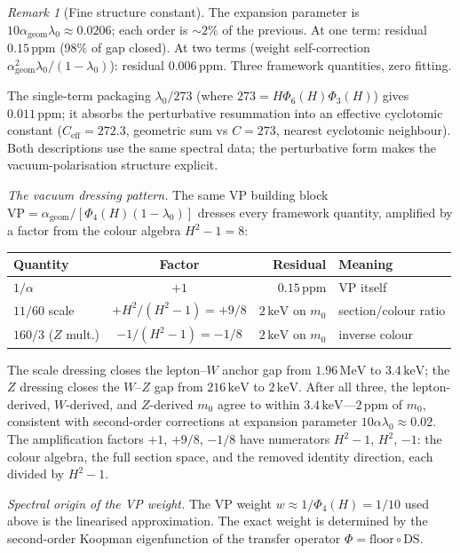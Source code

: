 \documentclass[11pt,a4paper]{article}
\theoremstyle{definition}
\theoremstyle{remark}
\newtheorem{remark}[theorem]{Remark}
\begin{document}
\begin{remark}[Fine structure constant]
The expansion parameter is $10\alpha_{\mathrm{geom}}\lambda_0\approx 0.0206$; each order is ${\sim}2\%$ of the previous. At one term: residual $0.15\,\mathrm{ppm}$ ($98\%$ of gap closed). At two terms (weight self-correction $\alpha_{\mathrm{geom}}^2\lambda_0/(1-\lambda_0)$): residual $0.006\,\mathrm{ppm}$. Three framework quantities, zero fitting.

The single-term packaging $\lambda_0/273$ (where $273=H\Phi_6(H)\Phi_3(H)$) gives $0.011\,\mathrm{ppm}$; it absorbs the perturbative resummation into an effective cyclotomic constant ($C_{\mathrm{eff}}=272.3$, geometric sum vs $C=273$, nearest cyclotomic neighbour). Both descriptions use the same spectral data; the perturbative form makes the vacuum-polarisation structure explicit.

\emph{The vacuum dressing pattern.} The same VP building block $\mathrm{VP}=\alpha_{\mathrm{geom}}/[\Phi_4(H)(1\!-\!\lambda_0)]$ dresses every framework quantity, amplified by a factor from the colour algebra $H^2\!-\!1=8$:
\begin{center}
\begin{tabular}{lcrl}
\toprule
\textbf{Quantity} & \textbf{Factor} & \textbf{Residual} & \textbf{Meaning} \\
\midrule
$1/\alpha$ & $+1$ & $0.15\,\mathrm{ppm}$ & $\mathrm{VP}$ itself \\
$11/60$ scale & $+H^2/(H^2\!-\!1)=+9/8$ & $2\,\mathrm{keV}$ on $m_0$ & section/colour ratio \\
$160/3$ ($Z$ mult.) & $-1/(H^2\!-\!1)=-1/8$ & $2\,\mathrm{keV}$ on $m_0$ & inverse colour \\
\bottomrule
\end{tabular}
\end{center}
The scale dressing closes the lepton--$W$ anchor gap from $1.96\,\mathrm{MeV}$ to $3.4\,\mathrm{keV}$; the $Z$ dressing closes the $W$--$Z$ gap from $216\,\mathrm{keV}$ to $2\,\mathrm{keV}$. After all three, the lepton-derived, $W$-derived, and $Z$-derived $m_0$ agree to within $3.4\,\mathrm{keV}$---$2\,\mathrm{ppm}$ of $m_0$, consistent with second-order corrections at expansion parameter $10\alpha\lambda_0\approx 0.02$. The amplification factors $+1$, $+9/8$, $-1/8$ have numerators $H^2\!-\!1$, $H^2$, $-1$: the colour algebra, the full section space, and the removed identity direction, each divided by $H^2\!-\!1$.

\emph{Spectral origin of the VP weight.} The VP weight $w\approx 1/\Phi_4(H)=1/10$ used above is the linearised approximation. The exact weight is determined by the second-order Koopman eigenfunction of the transfer operator $\Phi=\mathrm{floor}\circ\mathrm{DS}$.


\end{remark}
\end{document}
